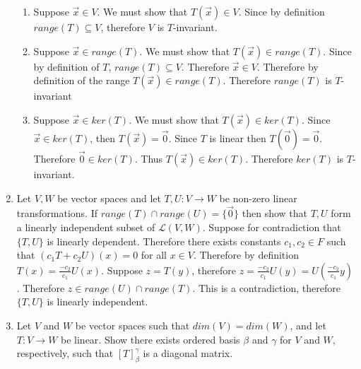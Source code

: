 \documentclass[12pt, letterpaper]{article}
\begin{document}
\begin{enumerate}
\begin{enumerate}
			\item Suppose $\Vec{x} \in V$.  We must show that $T(\Vec{x}) \in V$.  Since by definition $range(T) \subseteq V$, therefore $V$ is $T$-invariant.  
			\item Suppose $\Vec{x} \in range(T)$.  We must show that $T(\Vec{x}) \in range(T).$  Since by definition of $T$, $range(T) \subseteq V$.  Therefore $\Vec{x} \in V$.  Therefore by definition of the range $T(\Vec{x}) \in range(T)$.  Therefore $range(T)$ is $T$-invariant
			\item Suppose $\Vec{x} \in ker(T)$.  We must show that $T(\Vec{x}) \in ker(T)$.  Since $\Vec{x} \in ker(T)$, then $T(\Vec{x}) = \Vec{0}$.  Since $T$ is linear then $T(\Vec{0}) = \Vec{0}$.  Therefore $\Vec{0} \in ker(T)$.  Thus $T(\Vec{x}) \in ker(T)$.  Therefore $ker(T)$ is $T$-invariant.  
		\end{enumerate}
		\newpage
		\item Let $V,W$ be vector spaces and let $T,U: V\to W$ be non-zero linear transformations.  If $range(T) \cap range(U) = \{\Vec{0}\}$ then show that $T,U$ form a linearly independent subset of $\mathcal{L}(V,W)$.
		Suppose for contradiction that $\{T,U\}$ is linearly dependent.  Therefore there exists constants $c_1,c_2 \in F$ such that $(c_1 T + c_2 U)(x) = 0$ for all $x \in V$. Therefore by definition $T(x) = \frac{-c_2}{c_1} U(x)$.  Suppose $z = T(y)$, therefore $z = \frac{-c_2}{c_1} U(y) = U(\frac{-c_2}{c_1} y)$.  Therefore $z \in range(U) \cap range(T)$.  This is a contradiction, therefore $\{T,U\}$ is linearly independent.  
		\newpage
		\item Let $V$ and $W$ be vector spaces such that $dim(V) = dim(W)$, and let $T: V \to W$ be linear.  Show there exists ordered basis $\beta$ and $\gamma$ for $V$ and $W$, respectively, such that $[T]_\beta^\gamma$ is a diagonal matrix.
		

\end{enumerate}
\end{document}
